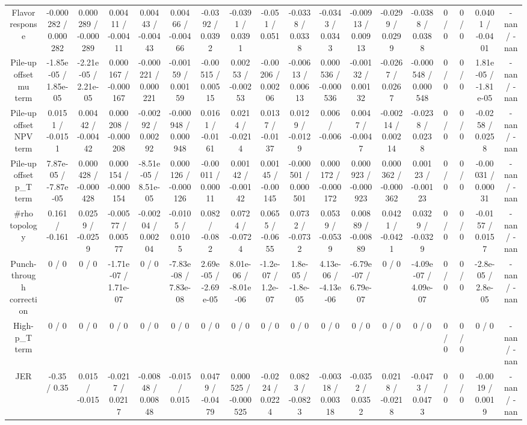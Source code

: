 \documentclass[10pt]{article}
\begin{document}
\begin{table}[htbp]
\begin{center}
\begin{tabular}{|c|c|c|c|c|c|c|c|c|c|c|c|c|c|c|c|c|c|}
  Flavor response & -0.000282 / 0.000282 & 0.000289 / -0.000289 & 0.00411 / -0.00411 & 0.00443 / -0.00443 & 0.00466 / -0.00466 & -0.0392 / 0.0392 & -0.0391 / 0.0391 & -0.051 / 0.051 & -0.0338 / 0.0338 & -0.0343 / 0.0343 & -0.00913 / 0.00913 & -0.0299 / 0.0299 & -0.0388 / 0.0388 & 0 / 0 & 0 / 0 & 0.0401 / -0.0401 & -nan / -nan \\ 
  Pile-up offset mu term & -1.85e-05 / 1.85e-05 & -2.21e-05 / 2.21e-05 & 0.000167 / -0.000167 & -0.000221 / 0.000221 & -0.00159 / 0.00159 & -0.00515 / 0.00515 & 0.00253 / -0.00253 & -0.00206 / 0.00206 & -0.00613 / 0.00613 & 0.000536 / -0.000536 & -0.00132 / 0.00132 & -0.0267 / 0.0267 & -0.000548 / 0.000548 & 0 / 0 & 0 / 0 & 1.81e-05 / -1.81e-05 & -nan / -nan \\ 
  Pile-up offset NPV term & 0.0151 / -0.0151 & 0.00442 / -0.00442 & 0.000208 / -0.000208 & -0.00292 / 0.00292 & -0.000948 / 0.000948 & 0.0161 / -0.0161 & 0.0214 / -0.0214 & 0.0137 / -0.0137 & 0.0129 / -0.0129 & 0.006 / -0.006 & 0.0047 / -0.0047 & -0.00214 / 0.00214 & -0.0238 / 0.0238 & 0 / 0 & 0 / 0 & -0.0258 / 0.0258 & -nan / -nan \\ 
  Pile-up offset p_{T} term & 7.87e-05 / -7.87e-05 & 0.000428 / -0.000428 & 0.000154 / -0.000154 & -8.51e-05 / 8.51e-05 & 0.000126 / -0.000126 & -0.00011 / 0.00011 & 0.00142 / -0.00142 & 0.00145 / -0.00145 & -0.000501 / 0.000501 & 0.000172 / -0.000172 & 0.000923 / -0.000923 & 0.000362 / -0.000362 & 0.00123 / -0.00123 & 0 / 0 & 0 / 0 & -0.00031 / 0.00031 & -nan / -nan \\ 
  #rho topology & 0.161 / -0.161 & 0.0259 / -0.0259 & -0.00577 / 0.00577 & -0.00204 / 0.00204 & -0.0105 / 0.0105 & 0.082 / -0.082 & 0.0724 / -0.0724 & 0.0655 / -0.0655 & 0.0732 / -0.0732 & 0.0539 / -0.0539 & 0.00889 / -0.00889 & 0.0421 / -0.0421 & 0.0329 / -0.0329 & 0 / 0 & 0 / 0 & -0.0157 / 0.0157 & -nan / -nan \\ 
  Punch-through correction & 0 / 0 & 0 / 0 & -1.71e-07 / 1.71e-07 & 0 / 0 & -7.83e-08 / 7.83e-08 & 2.69e-05 / -2.69e-05 & 8.01e-06 / -8.01e-06 & -1.2e-07 / 1.2e-07 & 1.8e-05 / -1.8e-05 & 4.13e-06 / -4.13e-06 & -6.79e-07 / 6.79e-07 & 0 / 0 & -4.09e-07 / 4.09e-07 & 0 / 0 & 0 / 0 & -2.8e-05 / 2.8e-05 & -nan / -nan \\ 
  High-p_{T} term & 0 / 0 & 0 / 0 & 0 / 0 & 0 / 0 & 0 / 0 & 0 / 0 & 0 / 0 & 0 / 0 & 0 / 0 & 0 / 0 & 0 / 0 & 0 / 0 & 0 / 0 & 0 / 0 & 0 / 0 & 0 / 0 & -nan / -nan \\ 
  JER & -0.35 / 0.35 & 0.015 / -0.015 & -0.0217 / 0.0217 & -0.00848 / 0.00848 & -0.015 / 0.015 & 0.0479 / -0.0479 & 0.000525 / -0.000525 & -0.0224 / 0.0224 & 0.0823 / -0.0823 & -0.00318 / 0.00318 & -0.0352 / 0.0352 & 0.0218 / -0.0218 & -0.0473 / 0.0473 & 0 / 0 & 0 / 0 & -0.0019 / 0.0019 & -nan / -nan \\ 

\end{tabular}
\end{center}
\end{table}
\end{document}
